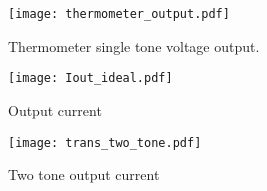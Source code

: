 \begin{figure}[htp] 
\texttt{[image: thermometer\_output.pdf]}
\caption{Thermometer single tone voltage output.}
\label{fig:Thermometer}
\end{figure}

\begin{figure}[htp] 
\texttt{[image: Iout\_ideal.pdf]}
\caption{Output current}
\label{fig:Output current}
\end{figure}

\begin{figure}[htp] 
\texttt{[image: trans\_two\_tone.pdf]}
\caption{Two tone output current}
\label{transient_two_tone}
\end{figure}
